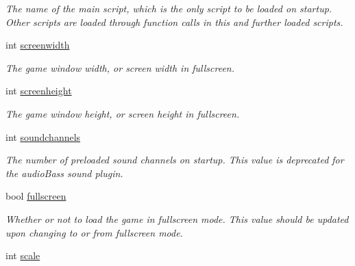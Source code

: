 \begin{DoxyCompactItemize}
\begin{DoxyCompactList}\small\item\em The name of the main script, which is the only script to be loaded on startup. Other scripts are loaded through function calls in this and further loaded scripts. \end{DoxyCompactList}\item 
\hypertarget{structTS__Config_a60aad41eb9eaf2c972ffe9e4a9163284}{int \hyperlink{structTS__Config_a60aad41eb9eaf2c972ffe9e4a9163284}{screenwidth}}\label{structTS__Config_a60aad41eb9eaf2c972ffe9e4a9163284}

\begin{DoxyCompactList}\small\item\em The game window width, or screen width in fullscreen. \end{DoxyCompactList}\item 
\hypertarget{structTS__Config_a43bec80be6531aac79f87fad61f08ca7}{int \hyperlink{structTS__Config_a43bec80be6531aac79f87fad61f08ca7}{screenheight}}\label{structTS__Config_a43bec80be6531aac79f87fad61f08ca7}

\begin{DoxyCompactList}\small\item\em The game window height, or screen height in fullscreen. \end{DoxyCompactList}\item 
\hypertarget{structTS__Config_a1db30e512a0408bfc1f6fef9896a7d63}{int \hyperlink{structTS__Config_a1db30e512a0408bfc1f6fef9896a7d63}{soundchannels}}\label{structTS__Config_a1db30e512a0408bfc1f6fef9896a7d63}

\begin{DoxyCompactList}\small\item\em The number of preloaded sound channels on startup. This value is deprecated for the audio\-Bass sound plugin. \end{DoxyCompactList}\item 
\hypertarget{structTS__Config_a1d049117d6bb14898e3dee5c110dd906}{bool \hyperlink{structTS__Config_a1d049117d6bb14898e3dee5c110dd906}{fullscreen}}\label{structTS__Config_a1d049117d6bb14898e3dee5c110dd906}

\begin{DoxyCompactList}\small\item\em Whether or not to load the game in fullscreen mode. This value should be updated upon changing to or from fullscreen mode. \end{DoxyCompactList}\item 
\hypertarget{structTS__Config_ab8a3bfad3766f5080c89e6bd3b0f2e48}{int \hyperlink{structTS__Config_ab8a3bfad3766f5080c89e6bd3b0f2e48}{scale}}\label{structTS__Config_ab8a3bfad3766f5080c89e6bd3b0f2e48}


\end{DoxyCompactItemize}

